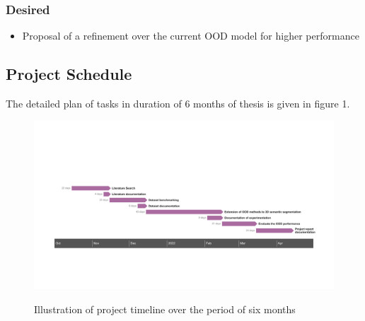 \documentclass[thesis]{mas_proposal}
\begin{document}
\subsubsection*{Desired}
\begin{itemize}
    \item Proposal of a refinement over the current OOD model for higher performance
\end{itemize}

\subsection{Project Schedule}
The detailed plan of tasks in duration of 6 months of thesis is given in figure 1.

\begin{figure}[h!]
    \caption{Illustration of project timeline over the period of six months}
    \includegraphics[scale=0.16]{images/rnd_deliverable_timeline}
    \label{fig:schedl}
\end{figure}

\nocite{*}


\end{document}
